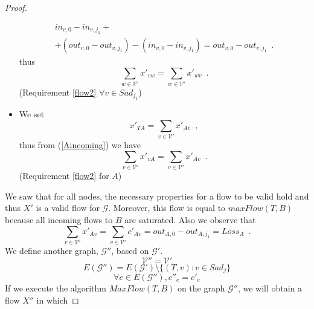\documentclass[11pt]{llncs}
\begin{document}
\begin{proof}
\begin{itemize}
\begin{equation}
\begin{gathered}
             in_{v, 0} - in_{v, j_1} + \\ + (out_{v, 0} - out_{v, j_1}) - (in_{v, 0} - in_{v, j_1}) = out_{v, 0} -
             out_{v, j_1} \enspace.
          \end{gathered}
          \end{equation}
          thus
          \begin{equation}
             \sum\limits_{w \in \mathcal{V}'}x'_{vw} = \sum\limits_{w \in \mathcal{V}'}x'_{wv} \enspace.
          \end{equation}
          (Requirement \ref{flow2} $\forall v \in Sad_{j_1}$)
          \item We set
          \begin{equation}
             x'_{TA} = \sum\limits_{v \in \mathcal{V}'}x'_{Av} \enspace,
          \end{equation}
          thus from (\ref{Aincoming}) we have
          \begin{equation}
             \sum\limits_{v \in \mathcal{V}'}x'_{vA} = \sum\limits_{v \in \mathcal{V}'}x'_{Av} \enspace.
          \end{equation}
          (Requirement \ref{flow2} for $A$)
       \end{itemize}
       We saw that for all nodes, the necessary properties for a flow to be valid hold and thus $X'$ is a valid flow for
       $\mathcal{G}$. Moreover, this flow is equal to $maxFlow(T, B)$ because all incoming flows to $B$ are saturated.
       Also we observe that
       \begin{equation}
       \label{xprimeequalloss}
          \sum\limits_{v \in \mathcal{V}'}x'_{Av} = \sum\limits_{v \in \mathcal{V}'}c'_{Av} = out_{A, 0} - out_{A, j_1} =
          Loss_A \enspace.
       \end{equation}
       We define another graph, $\mathcal{G}''$, based on $\mathcal{G}'$.
       \begin{equation}
          \mathcal{V}'' = \mathcal{V}'
       \end{equation}
       \begin{equation}
          E(\mathcal{G}'') = E(\mathcal{G}') \setminus \{(T, v) : v \in Sad_j\}
       \end{equation}
       \begin{equation}
          \forall e \in E(\mathcal{G}''), c''_e = c'_e
       \end{equation}
       If we execute the algorithm $MaxFlow(T, B)$ on the graph $\mathcal{G}''$, we will obtain a flow $X''$ in which

\end{proof}
\end{document}
